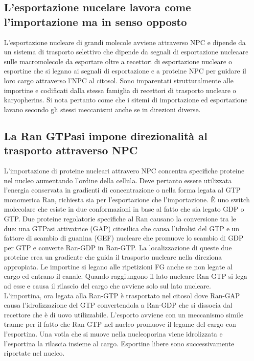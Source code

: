 \subsection{L'esportazione nucelare lavora come l'importazione ma in senso opposto}
L'esportazione nucleare di grandi molecole avviene attraverso NPC e dipende da un sistema di trasporto selettivo che dipende da segnali di esportazione nucleaare sulle macromolecole da
esportare oltre a recettori di esportazione nucleare o esportine che si legano ai segnali di esportazione e a proteine NPC per guidare il loro cargo attraverso l'NPC al citosol.
Sono imparentati strutturalmente alle importine e codificati dalla stessa famiglia di recettori di trasporto nucleare o karyopherins. Si nota pertanto come che i sitemi di importazione
ed esportazione lavano secondo gli stessi meccanismi anche se in direzioni diverse.
\subsection{La Ran GTPasi impone direzionalit\`a al trasporto attraverso NPC}
L'importazione di proteine nucleari attravero NPC concentra specifiche proteine nel nucleo aumentando l'ordine della cellula. Deve pertanto essere utilizzata l'energia conservata in
gradienti di concentrazione o nella forma legata al GTP monomerica Ran, richiesta sia per l'esportazione che l'importazione. \`E uno switch molecolare che esiste in due conformazioni
in base al fatto che sia legato GDP o GTP. Due proteine regolatorie specifiche al Ran causano la conversione tra le due: una GTPasi attivatrice (GAP) citosilica che causa l'idrolisi 
del GTP e un fattore di scambio di guanina (GEF) nucleare che promuove lo scambio di GDP per GTP e converte Ran-GDP in Ran-GTP. La localizzazione di queste due proteine crea un gradiente
che guida il trasporto nucleare nella direziona appropiata. Le importine si legano alle ripetizioni FG anche se non legate al cargo ed entrano il canale. Quando raggiungono il lato 
nucleare Ran-GTP si lega ad esse e causa il rilascio del cargo che avviene solo sul lato nucleare. L'importina, ora legata alla Ran-GTP \`e trasportato nel citosol dove Ran-GAP causa
l'idrolizzazione del GTP convertendola a Ran-GDP che si dissocia dal recettore che \`e di uovo utilizzabile. L'esporto avviene con un meccanismo simile tranne per il fatto che Ran-GTP
nel nucleo promuove il legame del cargo con l'esportina. Una votla che si muove nella nucleoporina viene idrolizzata e l'esportina la rilascia insieme al cargo. Esportine libere sono
successivamente riportate nel nucleo.
